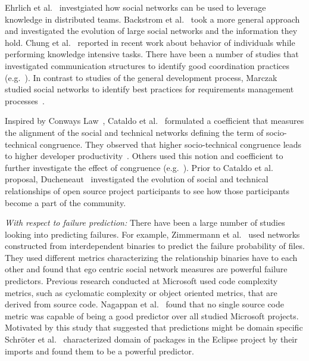 \documentclass[12pt,oneside]{book}
\begin{document}
Ehrlich et al.~\cite{ehrlich:icgse:2006} investgiated how social networks can be
used to leverage knowledge in distributed teams. Backstrom et
al.~\cite{backstrom:kdd:2006} took a more general approach and investigated the
evolution of large social networks and the information they hold. Chung et
al.~\cite{chung:cpr:07} reported in recent work about behavior of individuals
while performing knowledge intensive tasks. There have been a number of studies
that investigated communication structures to identify good
coordination practices
(e.g.~\cite{hinds:cscw:2006,hossain:cscw:2006,bird:fse:2008,hinds:hicss:2008}). In contrast to studies of the general development process, Marczak studied social
networks to identify best practices for requirements management
processes~\cite{marczak:re:2008}.

Inspired by Conways Law~\cite{conway:datamination:1968}, Cataldo et
al.~\cite{cataldo:cscw:2006,cataldo:esem:2008} formulated a coefficient that
measures the alignment of the social and technical networks defining the term of
socio-technical congruence. They observed that higher socio-technical congruence
leads to higher developer
productivity~\cite{cataldo:cscw:2006,cataldo:esem:2008}. Others used this
notion and coefficient to further investigate the effect of congruence
(e.g.~\cite{valetto:msr:2007}). Prior to Cataldo et
al.~\cite{cataldo:cscw:2006,cataldo:esem:2008} proposal,
Ducheneaut~\cite{ducheneaut:cscw:2005} investigated the evolution of social and
technical relationships of open source project participants to see how those
participants become a part of the community.


\emph{With respect to failure prediction:}
There have been a large number of studies looking into predicting failures. For
example, Zimmermann et al.~\cite{zimmermann:icse:2008} used
networks constructed from interdependent binaries to predict the failure
probability of files. They used different metrics characterizing the relationship
binaries have to each other and found that ego centric social network measures
are powerful failure predictors. Previous research conducted at Microsoft used
code complexity metrics, such as cyclomatic complexity or object oriented
metrics, that are derived from source code. Nagappan et
al.~\cite{nagappan:icse:2006} found
that no single source code metric was capable of being a good
predictor over all studied Microsoft projects. Motivated by this study that
suggested that predictions might be domain specific Schr\"oter et
al.~\cite{schroeter:isese:2006} characterized domain of packages in the Eclipse
project by their imports and found them to be a powerful predictor.
\end{document}
